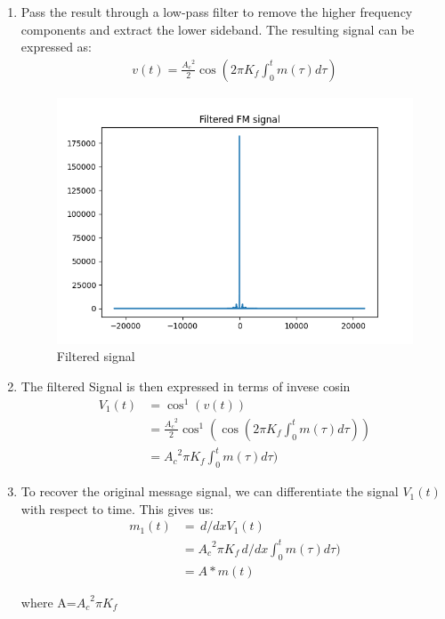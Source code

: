 \documentclass[journal,5pt,twocolumn]{IEEEtran}
\begin{document}
\begin{enumerate}
\item    Pass the result through a low-pass filter to remove the higher frequency components and extract the lower sideband. The resulting signal can be expressed as:
    \begin{align*}
     v(t)=\frac{{A_c}^2}{2}\cos (2\pi K_{f} \int_{0}^t m(\tau) d\tau)
    \end{align*}
    \begin{figure}
\centering 
\includegraphics[width=\columnwidth]{../figs/lp.png} 
\caption{Filtered signal}
\label{fig:LPF}
\end{figure}
\item  The filtered Signal is then expressed in terms of invese cosin
  \begin{align*}
  {V_1}(t)&=\cos^1(v(t))\\
  &=\frac{{A_c}^2}{2}\cos^1(\cos (2\pi K_{f} \int_{0}^t m(\tau) d\tau))\\
  &={A_c}^2\pi K_{f} \int_{0}^t m(\tau) d\tau)
  \end{align*}


 \item   To recover the original message signal, we can differentiate the signal $V_1(t)$ with respect to time. This gives us:
\begin{align}
m_1(t)&= \,d/dxV_1(t)\\
&={A_c}^2\pi K_{f} \,d/dx \int_{0}^t m(\tau) d\tau)\\
&=A * m(t)
\end{align}

where A=${A_c}^2\pi K_{f}$


\end{enumerate}
\end{document}
